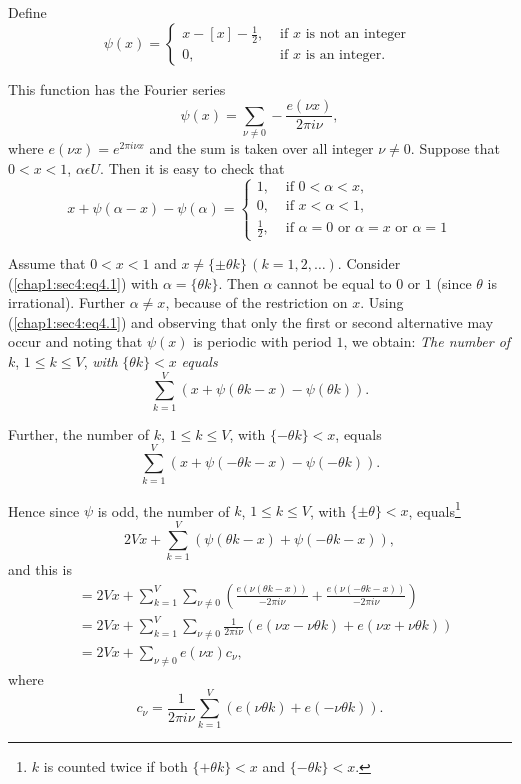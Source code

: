  Define
$$ \psi(x) =
\begin{cases}
 x-[x] - \frac{1}{2},& \text{ if }x \text{ is not an integer }\\
 0, & \text{ if }x \text{ is an integer. }
\end{cases}
$$

This function has the Fourier series 
$$
\psi(x) = \sum_{\nu \neq 0} - \frac{e(\nu x)}{2\pi i \nu},
$$
where $e(\nu x) = e^{2\pi i \nu x}$ and the sum is taken over all integer $\nu \neq 0$. Suppose that $0 < x < 1$, $\alpha \epsilon U$. Then it is easy to check that
\begin{equation*}
x + \psi(\alpha - x) - \psi(\alpha) =
 \begin{cases}
  1, & \text { if }0 < \alpha < x,\\
  0, & \text { if }x < \alpha < 1,\\
  \frac{1}{2}, & \text { if }\alpha = 0 \text{ or } \alpha = x \text{ or } \alpha =1\tag{4.1}\label{chap1:sec4:eq4.1}
 \end{cases}
\end{equation*}

Assume that $0 < x < 1$ and $x \neq \{\pm \theta k\} \, (k = 1, 2, \ldots)$. Consider (\ref{chap1:sec4:eq4.1}) with $\alpha = \{\theta k\}$. Then $\alpha$ cannot be equal to $0$ or $1$ (since $\theta$ is irrational). Further $\alpha \neq x$, because of the restriction on $x$. Using (\ref{chap1:sec4:eq4.1}) and observing that only the first or second alternative may occur and noting that $\psi(x)$ is periodic with period $1$, we obtain: {\em The number of} $k$, $1 \leq k \leq V$, {\em with} $\{\theta k\} < x$ {\em equals}\pageoriginale
$$
\sum_{k=1}^{V} (x + \psi(\theta k - x) - \psi (\theta k)).
$$ 

Further, the number of $k$, $1 \leq k \leq V$, with $\{-\theta k\} < x$, equals
$$
\sum_{k=1}^{V} (x + \psi(-\theta k -x) -\psi (-\theta k)).
$$

Hence since $\psi$ is odd, the number of $k$, $1 \leq k \leq V$, with $\{\pm \theta\}< x$, equals\footnote{$k$ is counted twice if both $\{+ \theta k\}< x$ and $\{-\theta k\}< x$.}
$$
2Vx + \sum_{k=1}^{V} (\psi(\theta k - x) + \psi(-\theta k - x)),
$$
and this is
\begin{align*}
& = 2Vx + \sum_{k=1}^{V} \sum_{\nu \neq 0} \left(\frac{e(\nu(\theta k-x))}{-2\pi i \nu}+ \frac{e(\nu(-\theta k-x))}{-2\pi i \nu}\right)\\
& = 2Vx + \sum_{k=1}^{V} \sum_{\nu \neq 0} \frac{1}{2\pi i \nu} (e(\nu x - \nu \theta  k) + e(\nu x + \nu \theta k))\\
& = 2Vx + \sum_{\nu \neq 0} e(\nu x)c_{\nu},
\end{align*}
where
$$
c_{\nu} = \frac{1}{2\pi i \nu} \sum_{k=1}^{V} (e(\nu \theta k) + e(-\nu \theta k)).
$$

